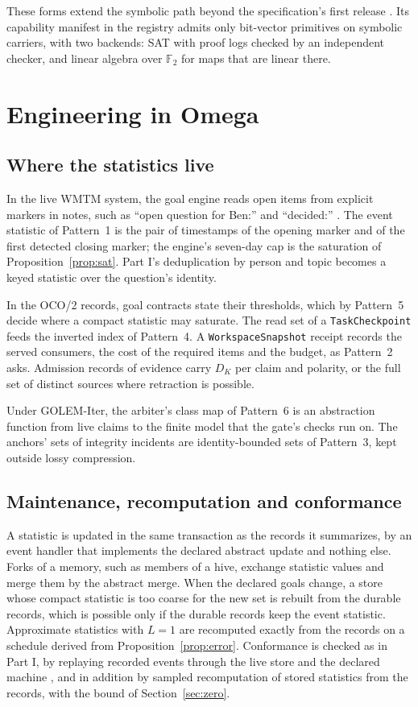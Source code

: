 \documentclass[11pt]{article}
\newcommand{\code}[1]{\texttt{#1}}
\newcommand{\F}{\mathbb{F}}
\theoremstyle{definition}
\theoremstyle{plain}
\begin{document}
These forms extend the symbolic path beyond the specification's first release
\cite[Section~16.1]{spec}. Its capability manifest in the registry admits only bit-vector
primitives on symbolic carriers, with two backends: SAT with proof logs checked by an independent
checker, and linear algebra over $\F_2$ for maps that are linear there.

\section{Engineering in Omega}\label{sec:engineering}

\subsection{Where the statistics live}

In the live WMTM system, the goal engine reads open items from explicit markers in notes, such as
``open question for Ben:'' and ``decided:'' \cite{wmtm}. The event statistic of Pattern~1 is
the pair of timestamps of the opening marker and of the first detected closing marker; the engine's
seven-day cap is the saturation of Proposition~\ref{prop:sat}. Part I's deduplication by person and
topic becomes a keyed statistic over the question's identity.

In the OCO/2 records, goal contracts state their thresholds, which by Pattern~5 decide where
a compact statistic may saturate. The read set of a \code{TaskCheckpoint} feeds the inverted index
of Pattern~4. A \code{WorkspaceSnapshot} receipt records the served consumers, the cost of the
required items and the budget, as Pattern~2 asks. Admission records of evidence carry $D_K$ per
claim and polarity, or the full set of distinct sources where retraction is possible.

Under GOLEM-Iter, the arbiter's class map of Pattern~6 is an abstraction function from live
claims to the finite model that the gate's checks run on. The anchors' sets of integrity incidents
are identity-bounded sets of Pattern~3, kept outside lossy compression.

\subsection{Maintenance, recomputation and conformance}

A statistic is updated in the same transaction as the records it summarizes, by an event handler
that implements the declared abstract update and nothing else. Forks of a memory, such as members
of a hive, exchange statistic values and merge them by the abstract merge. When the declared goals
change, a store whose compact statistic is too coarse for the new set is rebuilt from the durable
records, which is possible only if the durable records keep the event statistic. Approximate
statistics with $L=1$ are recomputed exactly from the records on a schedule derived from
Proposition~\ref{prop:error}. Conformance is checked as
in Part I, by replaying recorded events through the live store and the declared machine
\cite[Section~3.4]{part1}, and in addition by sampled recomputation of stored statistics from the
records, with the bound of Section~\ref{sec:zero}.
\end{document}
